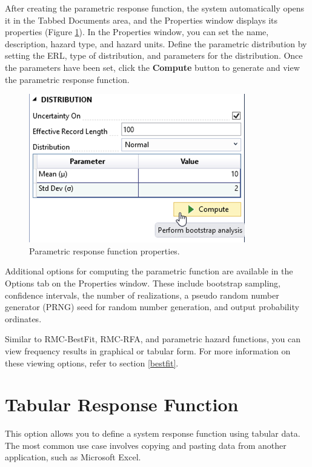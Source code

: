 \documentclass[
]{book}
\begin{document}
After creating the parametric response function, the system automatically opens it in the Tabbed Documents area, and the Properties window displays its properties (Figure \ref{fig:figure-101}). In the Properties window, you can set the name, description, hazard type, and hazard units. Define the parametric distribution by setting the ERL, type of distribution, and parameters for the distribution. Once the parameters have been set, click the \textbf{Compute} button to generate and view the parametric response function.

\begin{figure}

{\centering \includegraphics{images/figure101} 

}

\caption{Parametric response function properties.}\label{fig:figure-101}
\end{figure}

Additional options for computing the parametric function are available in the Options tab on the Properties window. These include bootstrap sampling, confidence intervals, the number of realizations, a pseudo random number generator (PRNG) seed for random number generation, and output probability ordinates.

Similar to RMC-BestFit, RMC-RFA, and parametric hazard functions, you can view frequency results in graphical or tabular form. For more information on these viewing options, refer to section \ref{bestfit}.

\hypertarget{tabular-response-function}{%
\section{Tabular Response Function}\label{tabular-response-function}}

This option allows you to define a system response function using tabular data. The most common use case involves copying and pasting data from another application, such as Microsoft Excel.
\end{document}
